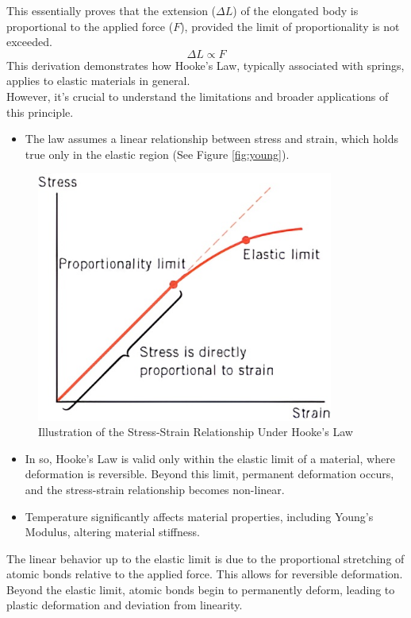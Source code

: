 \documentclass{article}
\begin{document}
\begin{minipage}{0.52\textwidth}
This essentially proves that the extension (\(\Delta L\)) of the elongated body is proportional to the applied force (\(F\)), provided the limit of proportionality is not exceeded. 
\begin{equation}
    \Delta L \propto F
\end{equation}
This derivation demonstrates how Hooke's Law, typically associated with springs, applies to elastic materials in general.\\[8pt] 
However, it's crucial to understand the limitations and broader applications of this principle.
\begin{itemize}
    \item The law assumes a linear relationship between stress and strain, which holds true only in the elastic region (See Figure \ref{fig:young}).
\end{itemize}
\end{minipage}\hfill
\begin{minipage}{0.45\textwidth}
    \begin{figure}[H]
    \centering
    \includegraphics[width=0.87\textwidth]{images/hook(1).png}
    \caption{Illustration of the Stress-Strain Relationship Under Hooke’s Law}
    \label{fig:hook}
\end{figure}
\end{minipage}
\begin{itemize}
    \item In so, Hooke's Law is valid only within the elastic limit of a material, where deformation is reversible. Beyond this limit, permanent deformation occurs, and the stress-strain relationship becomes non-linear.
    \item Temperature significantly affects material properties, including Young's Modulus, altering material stiffness.
\end{itemize}
The linear behavior up to the elastic limit is due to the proportional stretching of atomic bonds relative to the applied force. This allows for reversible deformation. Beyond the elastic limit, atomic bonds begin to permanently deform, leading to plastic deformation and deviation from linearity. \\[8pt]
\end{document}
